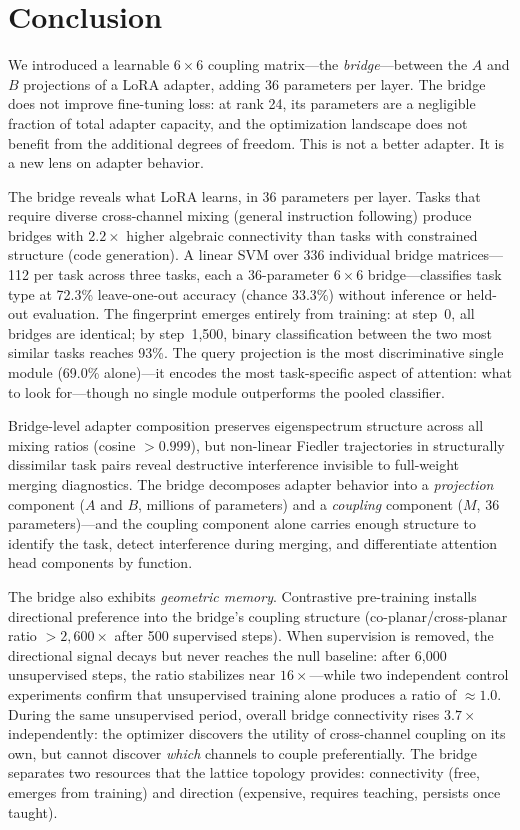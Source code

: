 \section{Conclusion}
\label{sec:conclusion}

We introduced a learnable $6 \times 6$ coupling matrix---the
\emph{bridge}---between the $A$ and $B$ projections of a LoRA
adapter, adding 36 parameters per layer. The bridge does not improve
fine-tuning loss: at rank 24, its parameters are a negligible
fraction of total adapter capacity, and the optimization landscape
does not benefit from the additional degrees of freedom. This is
not a better adapter. It is a new lens on adapter behavior.

The bridge reveals what LoRA learns, in 36 parameters per layer.
Tasks that require diverse cross-channel mixing (general instruction
following) produce bridges with $2.2\times$ higher algebraic
connectivity than tasks with constrained structure (code generation).
A linear SVM over 336 individual bridge matrices---112 per task
across three tasks, each a 36-parameter $6 \times 6$
bridge---classifies task type at 72.3\% leave-one-out accuracy
(chance 33.3\%) without
inference or held-out evaluation. The fingerprint emerges entirely
from training: at step~0, all bridges are identical; by step~1{,}500,
binary classification between the two most similar tasks reaches 93\%.
The query projection is the most discriminative single module
(69.0\% alone)---it encodes the most task-specific aspect of
attention: what to look for---though no single module outperforms
the pooled classifier.

Bridge-level adapter composition preserves eigenspectrum structure
across all mixing ratios (cosine $> 0.999$), but non-linear Fiedler
trajectories in structurally dissimilar task pairs reveal destructive
interference invisible to full-weight merging diagnostics. The bridge
decomposes adapter behavior into a \emph{projection} component
($A$ and $B$, millions of parameters) and a \emph{coupling} component
($M$, 36 parameters)---and the coupling component alone carries
enough structure to identify the task, detect interference during
merging, and differentiate attention head components by function.

The bridge also exhibits \emph{geometric memory}. Contrastive
pre-training installs directional preference into the bridge's
coupling structure (co-planar/cross-planar ratio $> 2{,}600\times$
after 500 supervised steps). When supervision is removed, the
directional signal decays but never reaches the null baseline:
after 6{,}000 unsupervised steps, the ratio stabilizes near
$16\times$---while two independent control experiments confirm
that unsupervised training alone produces a ratio of $\approx 1.0$.
During the same unsupervised period, overall bridge connectivity
rises $3.7\times$ independently: the optimizer discovers the utility
of cross-channel coupling on its own, but cannot discover
\emph{which} channels to couple preferentially. The bridge
separates two resources that the lattice topology provides:
connectivity (free, emerges from training) and direction (expensive,
requires teaching, persists once taught).

